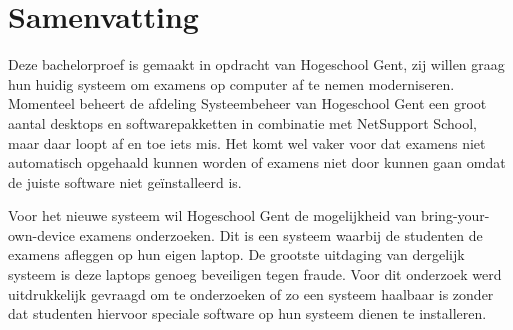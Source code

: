 
%
%

%



\chapter*{Samenvatting}

Deze bachelorproef is gemaakt in opdracht van Hogeschool Gent, zij willen graag hun huidig systeem om examens op computer af te nemen moderniseren. Momenteel beheert de afdeling Systeembeheer van Hogeschool Gent een groot aantal desktops en softwarepakketten in combinatie met NetSupport School, maar daar loopt af en toe iets mis. Het komt wel vaker voor dat examens niet automatisch opgehaald kunnen worden of examens niet door kunnen gaan omdat de juiste software niet ge\"{i}nstalleerd is. 

Voor het nieuwe systeem wil Hogeschool Gent de mogelijkheid van bring-your-own-device examens onderzoeken. Dit is een systeem waarbij de studenten de examens afleggen op hun eigen laptop. De grootste uitdaging van dergelijk systeem is deze laptops genoeg beveiligen tegen fraude. Voor dit onderzoek werd uitdrukkelijk gevraagd om te onderzoeken of zo een systeem haalbaar is zonder dat studenten hiervoor speciale software op hun systeem dienen te installeren.

